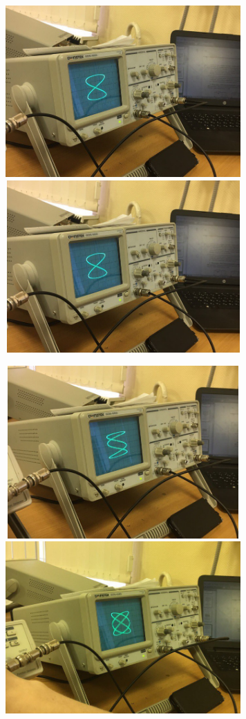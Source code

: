 \documentclass[14pt]{article}
\begin{document}
\begin{figure}[h!]
	\includegraphics[width = 9cm, height = 6.6cm]{lis_2_1new}
	\includegraphics[width = 9cm, height = 6.6cm]{lis_2_2new}
	\label{fig:image}
\end{figure}
\begin{figure}[h!]
	\includegraphics[width = 9cm, height = 6.6cm]{lis_3_1new}
	\includegraphics[width = 9cm]{lis_4_1new}
	\label{fig:image}
\end{figure}
\end{document}
